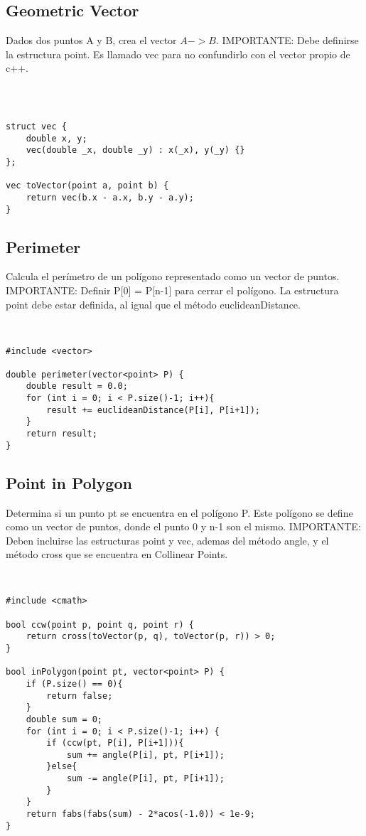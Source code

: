 \documentclass[11pt,letterpaper,twocolumn,twosided]{article}
\begin{document}
\subsection{Geometric Vector}
Dados dos puntos A y B, crea el vector $A->B$. IMPORTANTE: Debe definirse la estructura point. Es llamado vec para no confundirlo con el vector propio de c++.
\begin{lstlisting}



struct vec { 
	double x, y;  
  	vec(double _x, double _y) : x(_x), y(_y) {} 
};

vec toVector(point a, point b) {       
	return vec(b.x - a.x, b.y - a.y); 
}
\end{lstlisting}

\subsection{Perimeter}
Calcula el per\'imetro de un pol\'igono representado como un vector de puntos. IMPORTANTE: Definir P[0] = P[n-1] para cerrar el pol\'igono. La estructura point debe estar definida, al igual que el m\'etodo euclideanDistance.
\begin{lstlisting}


#include <vector>

double perimeter(vector<point> P) {
	double result = 0.0;
  	for (int i = 0; i < P.size()-1; i++){
    	result += euclideanDistance(P[i], P[i+1]);
  	}
  	return result; 
}

\end{lstlisting}

\subsection{Point in Polygon}
Determina si un punto pt se encuentra en el pol\'igono P. Este pol\'igono se define como un vector de puntos, donde el punto 0 y n-1 son el mismo. IMPORTANTE: Deben incluirse las estructuras point y vec, ademas del m\'etodo angle, y el m\'etodo cross que se encuentra en Collinear Points.
\begin{lstlisting}


#include <cmath>

bool ccw(point p, point q, point r) {
    return cross(toVector(p, q), toVector(p, r)) > 0; 
}
  
bool inPolygon(point pt, vector<point> P) {
	if (P.size() == 0){
  		return false;
  	} 
  	double sum = 0;    
  	for (int i = 0; i < P.size()-1; i++) {
    	if (ccw(pt, P[i], P[i+1])){
    		sum += angle(P[i], pt, P[i+1]); 
    	}else{
    		sum -= angle(P[i], pt, P[i+1]);
    	}
    }
  	return fabs(fabs(sum) - 2*acos(-1.0)) < 1e-9; 
}
\end{lstlisting}
\end{document}
